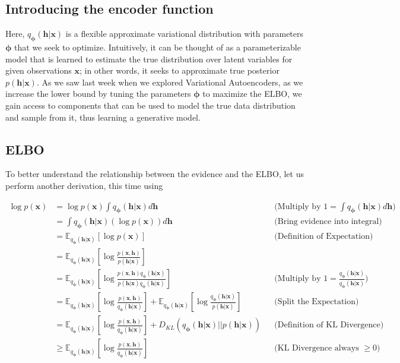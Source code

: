 \documentclass[%
oneside,                 %
final,                   %
10pt]{article}
\begin{document}
\subsection{Introducing the encoder function}

Here, $q_{\bm{\phi}}(\bm{h}|\bm{x})$ is a flexible approximate
variational distribution with parameters $\bm{\phi}$ that we seek to
optimize.  Intuitively, it can be thought of as a parameterizable
model that is learned to estimate the true distribution over latent
variables for given observations $\bm{x}$; in other words, it seeks to
approximate true posterior $p(\bm{h}|\bm{x})$.  As we saw last week when we
explored Variational Autoencoders, as we increase the lower bound
by tuning the parameters $\bm{\phi}$ to maximize the ELBO, we gain
access to components that can be used to model the true data
distribution and sample from it, thus learning a generative model.

\subsection{ELBO}

To better understand the relationship between the evidence and the ELBO, let us perform another derivation, this time using

\begin{align*}
\log p(\bm{x}) & = \log p(\bm{x}) \int q_{\bm{\phi}}(\bm{h}|\bm{x})d\bm{h} && \text{(Multiply by $1 = \int q_{\bm{\phi}}(\bm{h}|\bm{x})d\bm{h}$)}\\
          & = \int q_{\bm{\phi}}(\bm{h}|\bm{x})(\log p(\bm{x}))d\bm{h} && \text{(Bring evidence into integral)}\\
          & = \mathbb{E}_{q_{\bm{\phi}}(\bm{h}|\bm{x})}\left[\log p(\bm{x})\right] && \text{(Definition of Expectation)}\\
          & = \mathbb{E}_{q_{\bm{\phi}}(\bm{h}|\bm{x})}\left[\log\frac{p(\bm{x}, \bm{h})}{p(\bm{h}|\bm{x})}\right]&& \\
          & = \mathbb{E}_{q_{\bm{\phi}}(\bm{h}|\bm{x})}\left[\log\frac{p(\bm{x}, \bm{h})q_{\bm{\phi}}(\bm{h}|\bm{x})}{p(\bm{h}|\bm{x})q_{\bm{\phi}}(\bm{h}|\bm{x})}\right]&& \text{(Multiply by $1 = \frac{q_{\bm{\phi}}(\bm{h}|\bm{x})}{q_{\bm{\phi}}(\bm{h}|\bm{x})}$)}\\
          & = \mathbb{E}_{q_{\bm{\phi}}(\bm{h}|\bm{x})}\left[\log\frac{p(\bm{x}, \bm{h})}{q_{\bm{\phi}}(\bm{h}|\bm{x})}\right] + \mathbb{E}_{q_{\bm{\phi}}(\bm{h}|\bm{x})}\left[\log\frac{q_{\bm{\phi}}(\bm{h}|\bm{x})}{p(\bm{h}|\bm{x})}\right] && \text{(Split the Expectation)}\\
          & = \mathbb{E}_{q_{\bm{\phi}}(\bm{h}|\bm{x})}\left[\log\frac{p(\bm{x}, \bm{h})}{q_{\bm{\phi}}(\bm{h}|\bm{x})}\right] +
	  D_{KL}(q_{\bm{\phi}}(\bm{h}|\bm{x})\vert\vert p(\bm{h}|\bm{x}))  && \text{(Definition of KL Divergence)}\\
          & \geq \mathbb{E}_{q_{\bm{\phi}}(\bm{h}|\bm{x})}\left[\log\frac{p(\bm{x}, \bm{h})}{q_{\bm{\phi}}(\bm{h}|\bm{x})}\right]  && \text{(KL Divergence always $\geq 0$)}
\end{align*}
\end{document}
